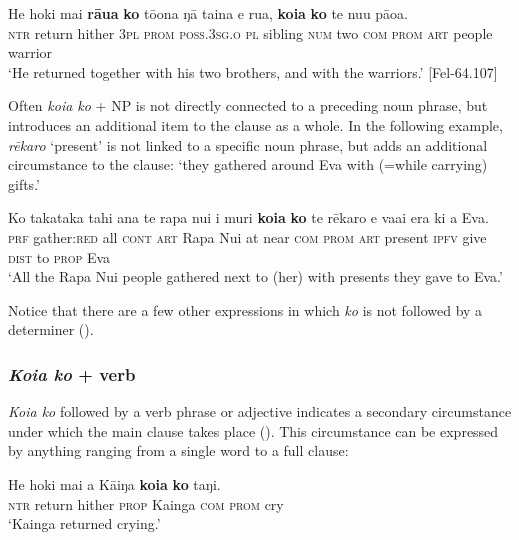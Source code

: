 \ea\label{ex:8.202}
\gll He hoki mai \textbf{rāua} \textbf{ko} tō{\ꞌ}ona ŋā taina e rua, \textbf{koia} \textbf{ko} te nu{\ꞌ}u pāoa.\\
\textsc{ntr} return hither \textsc{3pl} \textsc{prom} \textsc{poss.3sg.o} \textsc{pl} sibling \textsc{num} two \textsc{com} \textsc{prom} \textsc{art} people warrior\\

\glt
‘He returned together with his two brothers, and with the warriors.’ [Fel-64.107]
\z

Often \textit{koia ko} + NP is not directly connected to a preceding noun phrase, but introduces an additional item to the clause as a whole. In the following example, \textit{rēkaro} ‘present’ is not linked to a specific noun phrase, but adds an additional circumstance to the clause: ‘they gathered around Eva with (=while carrying) gifts.’

\ea\label{ex:8.203}
\gll Ko takataka tahi {\ꞌ}ana te rapa nui {\ꞌ}i muri \textbf{koia} \textbf{ko} te rēkaro  e va{\ꞌ}ai era ki a Eva.\\
\textsc{prf} gather:\textsc{red} all \textsc{cont} \textsc{art} Rapa Nui at near \textsc{com} \textsc{prom} \textsc{art} present  \textsc{ipfv} give \textsc{dist} to \textsc{prop} Eva\\

\glt 
‘All the Rapa Nui people gathered next to (her) with presents they gave to Eva.’ \textstyleExampleref{[R210.218]} 
\z

Notice that there are a few other expressions in which \textit{ko} is not followed by a determiner ().

\subsubsection{\textit{Koia ko} + verb}\label{sec:8.10.4.2}
\textit{Koia ko} followed by a verb phrase or adjective indicates a secondary circumstance under which the main clause takes place (). This circumstance can be expressed by anything ranging from a single word to a full clause:

\ea\label{ex:8.204}
\gll He hoki mai a Kāiŋa \textbf{koia} \textbf{ko} taŋi.\\
\textsc{ntr} return hither \textsc{prop} Kainga \textsc{com} \textsc{prom} cry\\

\glt 
‘Kainga returned crying.’ \textstyleExampleref{[R243.173]} 
\z

